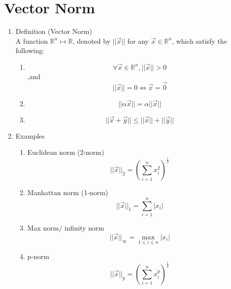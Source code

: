 \documentclass[11pt]{article}
\begin{document}
\section{Vector Norm}
\begin{enumerate}
\item{Definition} (Vector Norm)\\
A function $\mathbb{R}^{n} \mapsto \mathbb{R}$, denoted by $||\vec{x}||$ for any $\vec{x} \in \mathbb{R}^{n}$, which satisfy the following:
\begin{enumerate}
\item{$$\forall \vec{x} \in \mathbb{R}^{n}, ||\vec{x}|| > 0 $$ ,and $$||\vec{x} || = 0 \iff \vec{x} = \vec{0}$$}
\item{$$||\alpha \vec{x}|| = \alpha ||\vec{x}||$$}
\item{$$||\vec{x} + \vec{y}|| \leq ||\vec{x}|| + ||\vec{y}||$$}
\end{enumerate}
\item{Examples}
\begin{enumerate}
\item{Euclidean norm (2-norm)}
$$||\vec{x}||_{2} = \left(\sum_{i = 1}^{n} x_{i}^{2}\right)^{\frac{1}{2}}$$
\item{Manhattan norm (1-norm)}
$$||\vec{x}||_{1} = \sum_{i = 1}^{n} |x_{i}|$$
\item{Max norm/ infinity norm}
$$||\vec{x}||_{\infty} = \max_{1 \leq i \leq n} |x_{i}|$$
\item{p-norm}
$$||\vec{x}||_{p} = \left(\sum_{i = 1}^{n} x_{i}^{p}\right)^{\frac{1}{p}}$$
\end{enumerate}
\end{enumerate}

\newpage
\end{document}

